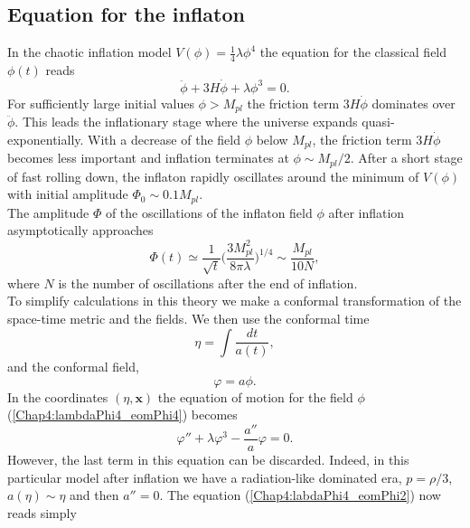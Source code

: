 \documentclass[11pt,a4paper,twoside]{book}
\begin{document}
\subsection{Equation for the inflaton}
In the chaotic inflation model $ V(\phi)=\frac{1}{4} \lambda \phi^{4}$ the equation for the classical field $\phi(t)$ reads
\begin{equation}
\label{Chap4:lambdaPhi4_eomPhi4}
\ddot{\phi} + 3H\dot{\phi} + \lambda \phi^{3}=0.
\end{equation}
 For sufficiently large initial values $\phi > M_{pl}$ the friction term $ 3H\dot{\phi} $ dominates over $\ddot{\phi}$. This leads the inflationary stage where the universe expands quasi-exponentially. With a decrease of the field $\phi$ below $ M_{pl} $, the friction term $ 3H\dot{\phi} $ becomes less important and inflation terminates at $ \phi \sim M_{pl}/2 $. After a short stage of fast rolling down, the inflaton rapidly oscillates around  the minimum of $ V(\phi) $ with  initial amplitude $ \Phi_{0} \sim 0.1 M_{pl} $.\\
 The amplitude $\Phi$ of the oscillations of the inflaton field $\phi$ after inflation asymptotically approaches
 \begin{equation}
\label{Chap4:lambdaPhi4_inflaton}
\Phi(t) \simeq \frac{1}{\sqrt{t}}\Bigg(\frac{3M_{pl}^{2}}{8\pi \lambda}\Bigg)^{1/4} \sim \frac{M_{pl}}{10N},
 \end{equation}
 where $ N $ is the number of oscillations after the end of inflation.\\
 To simplify calculations in this theory we make a conformal transformation of the space-time metric and the fields. We then use the conformal time
 \begin{equation}
\label{Chap4:ConformalTime}
\eta = \int \frac{dt}{a(t)},
 \end{equation}
 and the conformal field,
 \begin{equation}
 	\label{Chap4:lambdaPhi4_ConformalField}
\varphi = a\phi.
 \end{equation}
 In the coordinates $ (\eta,\textbf{x}) $ the equation of motion for the field $\phi$ (\ref{Chap4:lambdaPhi4_eomPhi4}) becomes 
 \begin{equation}
\label{Chap4:labdaPhi4_eomPhi2}
\varphi'' + \lambda\varphi^{3} - \frac{a''}{a}\varphi=0.
 \end{equation}
 However, the last term in this equation can be discarded. Indeed, in this particular model after inflation we have a radiation-like dominated era, $ p=\rho/3 $,  $ a(\eta) \sim \eta $ and then $ a''= 0 $. The equation (\ref{Chap4:labdaPhi4_eomPhi2}) now reads simply
\end{document}
